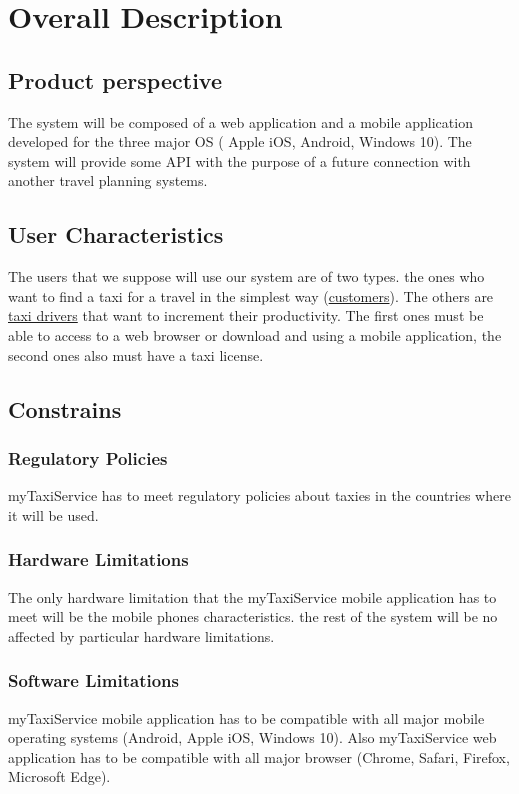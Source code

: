 \chapter{Overall Description}
	
	\section{Product perspective}
	The system will be composed of a web application and a mobile application developed for the three major OS ( Apple iOS, Android, Windows 10). The system will provide some API with the purpose of a future connection with another travel planning systems. 
		
	\section{User Characteristics}
	The users that we suppose will use our system are of two types. the ones who want to find a taxi for a travel in the simplest way (\hyperref[sec:customer]{customers}). The others are \hyperref[sec:tdriver]{taxi drivers} that want to increment their productivity. The first ones must be able to access to a web browser or download and using a mobile application, the second ones also must have a taxi license.
		
	\section{Constrains}
		
		\subsection{Regulatory Policies}
		myTaxiService  has to meet regulatory policies about taxies in the countries where it will be used.

		\subsection{Hardware Limitations}
		The only hardware limitation that the myTaxiService mobile application has to meet will be the mobile phones characteristics. the rest of the system will be no affected by particular hardware limitations.

		\subsection{Software Limitations}
		myTaxiService mobile application has to be compatible with all major mobile operating systems (Android, Apple iOS, Windows 10).
		Also myTaxiService web application has to be compatible with all major browser (Chrome, Safari, Firefox, Microsoft Edge).

